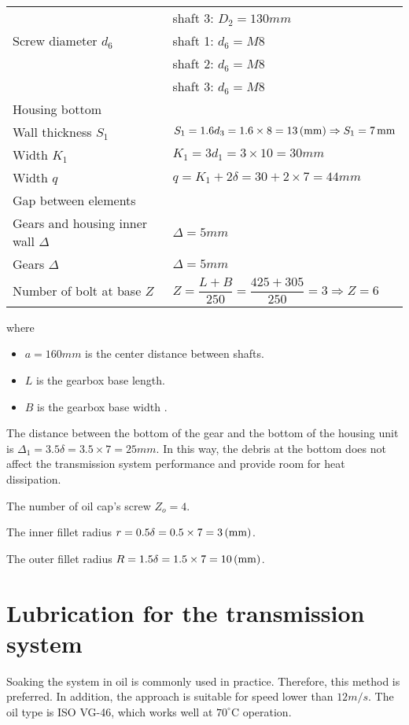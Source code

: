 \begin{table}
\begin{tabular}{ll}
		& shaft 3: $ D_2 = 130 \unit{mm} $\\
		Screw diameter $ d_6 $ & shaft 1: $ d_6 = M8 $\\
		& shaft 2: $ d_6 = M8 $\\
		& shaft 3: $ d_6 = M8 $\\\midrule
		Housing bottom\\\midrule
		Wall thickness $ S_1 $ & $ S_1 = 1.6d_3 = 1.6\times 8 = 13\, (\mathrm{mm}) \Rightarrow S_1 = 7\, \mathrm{mm}$\\
		Width $ K_1 $ & $ K_1 = 3d_1 = 3\times 10 = 30 \unit{mm} $\\
		Width $ q $ & $ q = K_1 + 2\delta = 30 + 2\times 7 = 44 \unit{mm} $\\\midrule
		Gap between elements\\\midrule
		Gears and housing inner wall $ \Delta $ & $ \Delta = 5\unit{mm} $\\
		Gears $ \Delta $ & $ \Delta = 5\unit{mm} $\\\midrule
		Number of bolt at base $ Z $ & $ Z = \dfrac{L+B}{250} = \dfrac{425+305}{250} = 3 \Rightarrow Z =6 $\\\bottomrule
	\end{tabular}
\end{table}
where 
\begin{itemize}
	\item $ a = 160 \unit{mm} $ is the center distance between shafts.
	\item $ L $ is the gearbox base length.
	\item $ B $ is the gearbox base width .
\end{itemize}

The distance between the bottom of the gear and the bottom of the housing unit is $ \Delta_1 = 3.5\delta = 3.5\times 7 = 25 \unit{mm} $. In this way,  the debris at the bottom does not affect the transmission system performance and provide room for heat dissipation.

The number of oil cap's screw $ Z_o = 4 $.

The inner fillet radius $ r = 0.5\delta = 0.5 \times 7 = 3 \, (\mathrm{mm}) $.

The outer fillet radius $ R = 1.5 \delta = 1.5 \times 7 = 10 \, (\mathrm{mm}) $.

\section{Lubrication for the transmission system}
Soaking the system in oil is commonly used in practice. Therefore, this method is preferred. In addition, the approach is suitable for speed lower than $ 12\unit{m/s} $. The oil type is ISO VG-46, which works well at $ 70^\circ $C operation.

